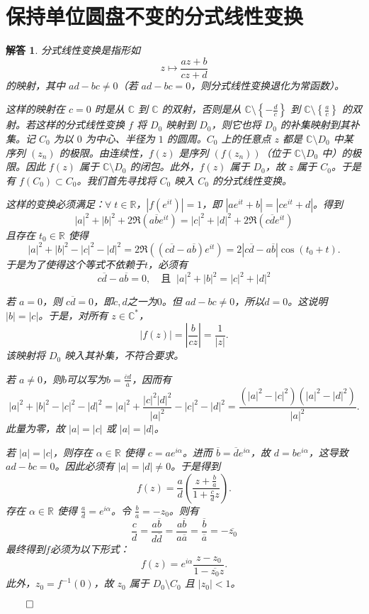 \documentclass[12pt,UTF8]{ctexbook}
\theoremstyle{exercisestyle}
\theoremstyle{solutionstyle}
\newtheorem*{solution*}{解答}
\newenvironment{solution}
  {\begin{solution*}}
  {\hfill\ensuremath{\qed}\end{solution*}}
\begin{document}
\section{保持单位圆盘不变的分式线性变换}
\begin{solution}
分式线性变换是指形如 
$$ z \mapsto \frac{az+b}{cz+d} $$
的映射，其中 \( ad - bc \neq 0 \)（若 \( ad - bc = 0 \)，则分式线性变换退化为常函数）。

这样的映射在 \( c=0 \) 时是从 \( \mathbb{C} \) 到 \( \mathbb{C} \) 的双射，否则是从 \( \mathbb{C} \setminus \left\{ -\frac{d}{c} \right\} \) 到 \( \mathbb{C} \setminus \left\{ \frac{a}{c} \right\} \) 的双射。若这样的分式线性变换 \( f \) 将 \( D_0 \) 映射到 \( D_0 \)，则它也将 \( D_0 \) 的补集映射到其补集。记 \( C_0 \) 为以 \( 0 \) 为中心、半径为 \( 1 \) 的圆周。\( C_0 \) 上的任意点 \( z \) 都是 \( \mathbb{C} \setminus D_0 \) 中某序列 \( (z_n) \) 的极限。由连续性，\( f(z) \) 是序列 \( (f(z_n)) \)（位于 \( \mathbb{C} \setminus D_0 \) 中）的极限。因此 \( f(z) \) 属于 \( \mathbb{C} \setminus D_0 \) 的闭包。此外，\( f(z) \) 属于 \( D_0 \)，故 \( z \) 属于 \( C_0 \)。于是有 \( f(C_0) \subset C_0 \)。我们首先寻找将 \( C_0 \) 映入 \( C_0 \) 的分式线性变换。

这样的变换必须满足：\(\forall\; t \in \mathbb{R} \)，\( |f(e^{it})| = 1 \)，即 \( |a e^{it} + b| = |c e^{it} + d| \)。得到
\[
|a|^2 + |b|^2 + 2 \Re(a \overline{b} e^{it}) = |c|^2 + |d|^2 + 2 \Re(c \overline{d} e^{it})
\]
且存在 \( t_0 \in \mathbb{R} \) 使得
\[
|a|^2 + |b|^2 - |c|^2 - |d|^2 = 2 \Re\left( (c \overline{d} - a \overline{b}) e^{it} \right) = 2 \left| c \overline{d} - a \overline{b} \right| \cos(t_0 + t).
\]
于是为了使得这个等式不依赖于$t$，必须有
\[
c \overline{d} - a \overline{b} = 0 ,\quad \mbox{且}\;\; |a|^2 + |b|^2 = |c|^2 + |d|^2
\]

若 \( a = 0 \)，则 \( c\overline{d} = 0 \)，即$c,d$之一为$0$。但 \( ad - bc \neq 0 \)，所以$d = 0$。这说明 \( |b| = |c| \)。于是，对所有 \( z \in \mathbb{C}^* \)，
\[
|f(z)| = \left| \frac{b}{c z} \right| = \frac{1}{|z|}.
\]
该映射将 \( D_0 \) 映入其补集，不符合要求。

若 \( a \neq 0 \)，则$b$可以写为\(\displaystyle b = \frac{\overline{c} d}{\overline{a}} \)，因而有
\[
|a|^2 + |b|^2 - |c|^2 - |d|^2 = |a|^2 + \frac{|c|^2 |d|^2}{|a|^2} - |c|^2 - |d|^2 = \frac{(|a|^2 - |c|^2)(|a|^2 - |d|^2)}{|a|^2}.
\]
此量为零，故 \( |a| = |c| \) 或 \( |a| = |d| \)。

若 \( |a| = |c| \)，则存在 \( \alpha \in \mathbb{R} \) 使得 \( c = a e^{i\alpha} \)。进而 \( \overline{b} = \overline{d} e^{i\alpha} \)，故 \( d = b e^{i\alpha} \)，这导致 \( ad - bc = 0 \)。因此必须有 \( |a| = |d| \neq 0 \)。于是得到
\[
f(z) = \frac{a}{d} \left( \frac{z + \frac{b}{a}}{1 + \frac{c}{d} z} \right).
\]
存在 \( \alpha \in \mathbb{R} \) 使得 \( \frac{a}{d} = e^{i\alpha} \)。令 \( \frac{b}{a} = -z_0 \)。则有
\[
\frac{c}{d} = \frac{a \overline{b}}{d \overline{d}} = \frac{a \overline{b}}{a \overline{a}} = \frac{\overline{b}}{\overline{a}} = -\overline{z_0}
\]
最终得到$f$必须为以下形式：
\[
f(z) = e^{i\alpha} \frac{z - z_0}{1 - \overline{z_0} z}.
\]
此外，\( z_0 = f^{-1}(0) \)，故 \( z_0 \) 属于 \( D_0 \setminus C_0 \) 且 \( |z_0| < 1 \)。


\end{solution}
\end{document}
